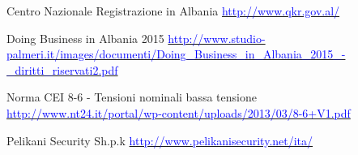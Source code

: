 \begin{thebibliography}{99}
	 Centro Nazionale Registrazione in Albania\newline 
			\href{http://www.qkr.gov.al/}{\textcolor{blue}{http://www.qkr.gov.al/}}

	 Doing Business in Albania 2015\newline 
			\href{http://www.studio-palmeri.it/images/documenti/Doing\_Business\_in\_Albania\_2015\_-\_diritti\_riservati2.pdf}{\textcolor{blue}{http://www.studio-palmeri.it/images/documenti/Doing\_Business\_in\_Albania\_2015\_-\_diritti\_riservati2.pdf}}

	 Norma CEI 8-6 - Tensioni nominali bassa tensione\newline 
			\href{http://www.nt24.it/portal/wp-content/uploads/2013/03/8-6+V1.pdf}{\textcolor{blue}{http://www.nt24.it/portal/wp-content/uploads/2013/03/8-6+V1.pdf}}
	
	 Pelikani Security Sh.p.k\newline 
			\href{http://www.pelikanisecurity.net/ita/}{\textcolor{blue}{http://www.pelikanisecurity.net/ita/}}
		
	
\end{thebibliography}
